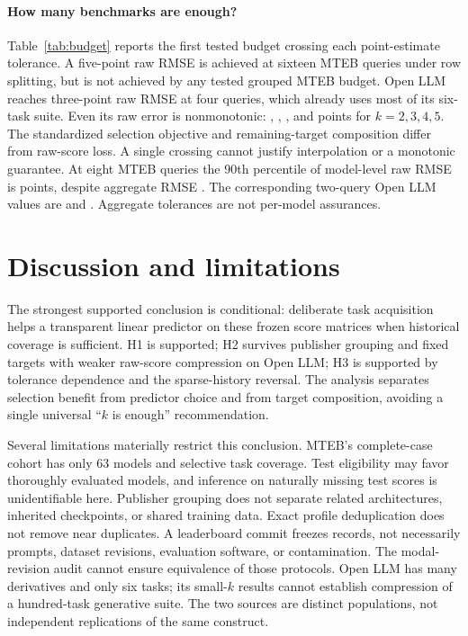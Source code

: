 \documentclass{article}
\begin{document}
\paragraph{How many benchmarks are enough?}
Table~\ref{tab:budget} reports the first tested budget crossing each point-estimate tolerance. A five-point raw RMSE is achieved at sixteen MTEB queries under row splitting, but is not achieved by any tested grouped MTEB budget. Open LLM reaches three-point raw RMSE at four queries, which already uses most of its six-task suite. Even its raw error is nonmonotonic: \LTwoRMSE{}, \LThreeRMSE{}, \LFourRMSE{}, and \LFiveRMSE{} points for $k=2,3,4,5$. The standardized selection objective and remaining-target composition differ from raw-score loss. A single crossing cannot justify interpolation or a monotonic guarantee. At eight MTEB queries the 90th percentile of model-level raw RMSE is \MTail{} points, despite aggregate RMSE \MRaw{}. The corresponding two-query Open LLM values are \LTail{} and \LRaw{}. Aggregate tolerances are not per-model assurances.

\begin{table}[t]
\centering\small
\caption{Smallest \emph{tested} Schur budget reaching a point-estimate tolerance. Raw RMSE is in score points. ``--'' means no tested budget reaches it. Crossings are descriptive, without simultaneous confidence or guarantees at larger budgets.}
\label{tab:budget}
\end{table}

\section{Discussion and limitations}
\label{sec:limitations}
The strongest supported conclusion is conditional: deliberate task acquisition helps a transparent linear predictor on these frozen score matrices when historical coverage is sufficient. H1 is supported; H2 survives publisher grouping and fixed targets with weaker raw-score compression on Open LLM; H3 is supported by tolerance dependence and the sparse-history reversal. The analysis separates selection benefit from predictor choice and from target composition, avoiding a single universal ``$k$ is enough'' recommendation.

Several limitations materially restrict this conclusion. MTEB's complete-case cohort has only 63 models and selective task coverage. Test eligibility may favor thoroughly evaluated models, and inference on naturally missing test scores is unidentifiable here. Publisher grouping does not separate related architectures, inherited checkpoints, or shared training data. Exact profile deduplication does not remove near duplicates. A leaderboard commit freezes records, not necessarily prompts, dataset revisions, evaluation software, or contamination. The modal-revision audit cannot ensure equivalence of those protocols. Open LLM has many derivatives and only six tasks; its small-$k$ results cannot establish compression of a hundred-task generative suite. The two sources are distinct populations, not independent replications of the same construct.
\end{document}
